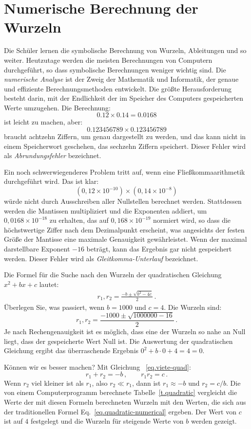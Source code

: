 \section{Numerische Berechnung der Wurzeln}\label{s.numerical}

Die Schüler lernen die symbolische Berechnung von Wurzeln, Ableitungen und so weiter. Heutzutage werden die meisten Berechnungen von Computern durchgeführt, so dass symbolische Berechnungen weniger wichtig sind. Die \emph{numerische Analyse} ist der Zweig der Mathematik und Informatik, der genaue und effiziente Berechnungsmethoden entwickelt. Die größte Herausforderung besteht darin, mit der Endlichkeit der im Speicher des Computers gespeicherten Werte umzugehen. Die Berechnung:
\[0.12\times 0.14=0.0168\]
ist leicht zu machen, aber:
\[
0.123456789\times 0.123456789
\]
braucht achtzehn Ziffern, um genau dargestellt zu werden, und das kann nicht in einem Speicherwort geschehen, das sechzehn Ziffern speichert. Dieser Fehler wird als \emph{Abrundungsfehler} bezeichnet.

Ein noch schwerwiegenderes Problem tritt auf, wenn eine Fließkommaarithmetik durchgeführt wird. Das ist klar:
\[(0,12\times 10^{-10})\times (0,14\times 10^{-8})\]
würde nicht durch Ausschreiben aller Nullstellen berechnet werden. Stattdessen werden die Mantissen multipliziert und die Exponenten addiert, um $0,0168\times 10^{-18}$ zu erhalten, das auf $0,168\times 10^{-19}$ normiert wird, so dass die höchstwertige Ziffer nach dem Dezimalpunkt erscheint, was angesichts der festen Größe der Mantisse eine maximale Genauigkeit gewährleistet. Wenn der maximal darstellbare Exponent $-16$ beträgt, kann das Ergebnis gar nicht gespeichert werden. Dieser Fehler wird als \emph{Gleitkomma-Unterlauf} bezeichnet.

Die Formel für die Suche nach den Wurzeln der quadratischen Gleichung $x^2+bx+c$ lautet:
\begin{align}
r_1, r_2 = \frac{-b\pm\sqrt{b^2-4c}}{2}\,.\label{eq.quadratic-numerical}
\end{align}
Überlegen Sie, was passiert, wenn $b=1000$ und $c=4$. Die Wurzeln sind:
\[
r_1, r_2 = \frac{-1000\pm\sqrt{1000000-16}}{2}\,.
\]
Je nach Rechengenauigkeit ist es möglich, dass eine der Wurzeln so nahe an Null liegt, dass der gespeicherte Wert Null ist. Die Auswertung der quadratischen Gleichung ergibt das überraschende Ergebnis $0^2+b\cdot 0 +4= 4= 0$.

Können wir es besser machen? Mit Gleichung ~\ref{eq.viete-quad}:
\[
r_1+r_2 = -b\,,\quad\quad r_1r_2=c\,.
\]
Wenn $r_2$ viel kleiner ist als $r_1$, also $r_2\ll r_1$, dann ist $r_1\approx -b$ und $r_2=c/b$. Die von einem Computerprogramm berechnete Tabelle~\ref{t.quadratic} vergleicht die Werte der mit diesen Formeln berechneten Wurzeln mit den Werten, die sich aus der traditionellen Formel Eq.~\ref{eq.quadratic-numerical} ergeben. Der Wert von $c$ ist auf $4$ festgelegt und die Wurzeln für steigende Werte von $b$ werden gezeigt.

